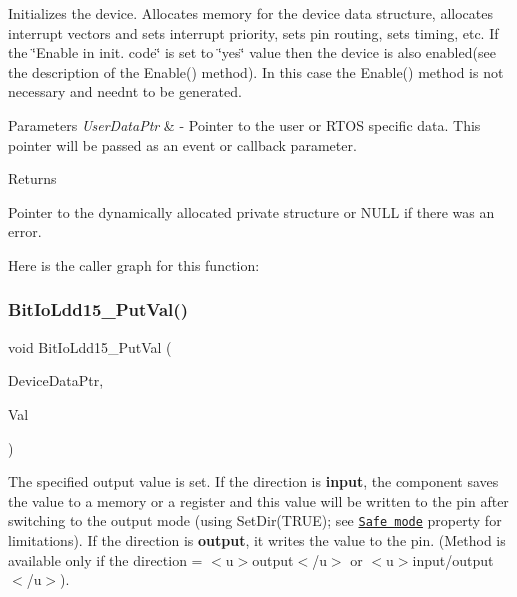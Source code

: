 Initializes the device. Allocates memory for the device data structure, allocates interrupt vectors and sets interrupt priority, sets pin routing, sets timing, etc. If the \char`\"{}\+Enable
    in init. code\char`\"{} is set to \char`\"{}yes\char`\"{} value then the device is also enabled(see the description of the Enable() method). In this case the Enable() method is not necessary and needn\textquotesingle{}t to be generated. 


\begin{DoxyParams}{Parameters}
{\em User\+Data\+Ptr} & -\/ Pointer to the user or R\+T\+OS specific data. This pointer will be passed as an event or callback parameter. \\
\hline
\end{DoxyParams}
\begin{DoxyReturn}{Returns}

\begin{DoxyItemize}
\item Pointer to the dynamically allocated private structure or N\+U\+LL if there was an error. 
\end{DoxyItemize}
\end{DoxyReturn}
Here is the caller graph for this function\+:
\mbox{\label{group___bit_io_ldd15__module_ga875a36906d376856264c546b784ae909}} 
\subsubsection{\texorpdfstring{Bit\+Io\+Ldd15\+\_\+\+Put\+Val()}{BitIoLdd15\_PutVal()}}
{\footnotesize\ttfamily void Bit\+Io\+Ldd15\+\_\+\+Put\+Val (\begin{DoxyParamCaption}\item[{\hyperlink{group___p_e___types__module_gac5cf1362f1f0e3a2ce71b1bf2276d091}{L\+D\+D\+\_\+\+T\+Device\+Data} $\ast$}]{Device\+Data\+Ptr,  }\item[{\hyperlink{group___p_e___types__module_ga97a80ca1602ebf2303258971a2c938e2}{bool}}]{Val }\end{DoxyParamCaption})}



The specified output value is set. If the direction is {\bfseries  input}, the component saves the value to a memory or a register and this value will be written to the pin after switching to the output mode (using {\ttfamily Set\+Dir(\+T\+R\+U\+E)}; see \href{BitIOProperties.html#SafeMode}{\tt Safe mode} property for limitations). If the direction is {\bfseries output}, it writes the value to the pin. (Method is available only if the direction = $<$u$>${\ttfamily output}$<$/u$>$ or $<$u$>${\ttfamily  input/output}$<$/u$>$). 


